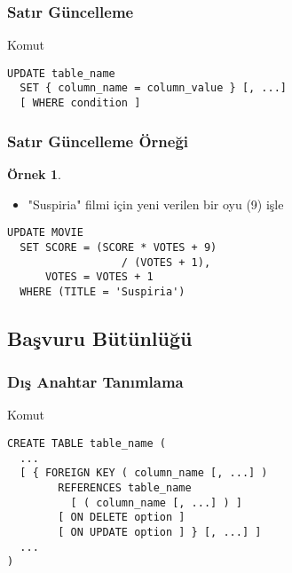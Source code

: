\documentclass[dvipsnames]{beamer}
\theoremstyle{definition}
\theoremstyle{example}
\newtheorem{ornek}[theorem]{Örnek}
\theoremstyle{plain}
\begin{document}
\begin{frame}[fragile]
  \frametitle{Satır Güncelleme}

  \begin{block}{Komut}
    \begin{lstlisting}
UPDATE table_name
  SET { column_name = column_value } [, ...]
  [ WHERE condition ]
    \end{lstlisting}
  \end{block}
\end{frame}

\begin{frame}[fragile]
  \frametitle{Satır Güncelleme Örneği}

  \begin{ornek}
    \begin{itemize}
      \item "Suspiria" filmi için yeni verilen bir oyu (9) işle
    \end{itemize}

    \begin{lstlisting}
UPDATE MOVIE
  SET SCORE = (SCORE * VOTES + 9)
                  / (VOTES + 1),
      VOTES = VOTES + 1
  WHERE (TITLE = 'Suspiria')
    \end{lstlisting}
  \end{ornek}
\end{frame}

\subsection{Başvuru Bütünlüğü}

\begin{frame}[fragile]
  \frametitle{Dış Anahtar Tanımlama}

  \begin{block}{Komut}
    \begin{lstlisting}
CREATE TABLE table_name (
  ...
  [ { FOREIGN KEY ( column_name [, ...] )
        REFERENCES table_name
          [ ( column_name [, ...] ) ]
        [ ON DELETE option ]
        [ ON UPDATE option ] } [, ...] ]
  ...
)
    \end{lstlisting}
  \end{block}
\end{frame}
\end{document}
